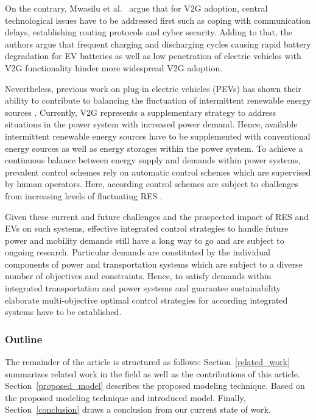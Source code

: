 On the contrary, Mwasilu et al.~\cite{mwasilu2014electric} argue that for V2G adoption, central technological issues have to be addressed first such as coping with communication delays, establishing routing protocols and cyber security. Adding to that, the authors argue that frequent charging and discharging cycles causing rapid battery degradation for EV batteries as well as low penetration of electric vehicles with V2G functionality hinder more widespread V2G adoption.

Nevertheless, previous work on plug-in electric vehicles (PEVs) has shown their ability to contribute to balancing the fluctuation of intermittent renewable energy sources \cite{dallinger2012grid}. Currently, V2G represents a supplementary strategy to address situations in the power system with increased power demand. Hence, available intermittent renewable energy sources have to be supplemented with conventional energy sources as well as energy storages within the power system. To achieve a continuous balance between energy supply and demands within power systems, prevalent control schemes rely on automatic control schemes which are supervised by human operators. Here, according control schemes are subject to challenges from increasing levels of fluctuating RES \cite{heussen2012unified}.

Given these current and future challenges and the prospected impact of RES and EVs on such systems, effective integrated control strategies to handle future power and mobility demands still have a long way to go and are subject to ongoing research. Particular demands are constituted by the individual components of power and transportation systems which are subject to a diverse number of objectives and constraints. Hence, to satisfy demands within integrated transportation and power systems and guarantee sustainability elaborate multi-objective optimal control strategies for according integrated systems have to be established.

\subsubsection*{Outline}

The remainder of the article is structured as follows: Section~\ref{related_work} summarizes related work in the field as well as the contributions of this article. Section~\ref{proposed_model} describes the proposed modeling technique. Based on the proposed modeling technique and introduced model. Finally, Section~\ref{conclusion} draws a conclusion from our current state of work.